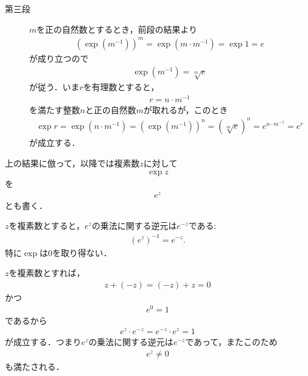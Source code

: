 \begin{sketch}
\begin{description}
			\item[第三段]
				$m$を正の自然数とするとき，前段の結果より
				\begin{align}
					(\exp{(m^{-1})})^{m} = \exp{(m \cdot m^{-1})} = \exp{1} = e
				\end{align}
				が成り立つので
				\begin{align}
					\exp{(m^{-1})} = \sqrt[m]{e}
				\end{align}
				が従う．いま$r$を有理数とすると，
				\begin{align}
					r = n \cdot m^{-1}
				\end{align}
				を満たす整数$n$と正の自然数$m$が取れるが，このとき
				\begin{align}
					\exp{r} = \exp{(n \cdot m^{-1})}
					= (\exp{(m^{-1})})^{n}
					= (\sqrt[m]{e})^{n}
					= e^{n \cdot m^{-1}}
					= e^r
				\end{align}
				が成立する．
				\QED
		\end{description}
	\end{sketch}
	
	上の結果に倣って，以降では複素数$z$に対して
	\begin{align}
		\exp{z}
	\end{align}
	を
	\begin{align}
		e^{z}
	\end{align}
	とも書く．
	
	\begin{screen}
		\begin{thm}[$e$のマイナス乗は逆元]\label{thm:inversion_of_exp_z_is_exp_minus_z}
			$z$を複素数とすると，$e^z$の乗法に関する逆元は$e^{-z}$である:
			\begin{align}
				(e^z)^{-1} = e^{-z}.
			\end{align}
			特に$\exp$は$0$を取り得ない．
		\end{thm}
	\end{screen}
	
	\begin{sketch}
		$z$を複素数とすれば，
		\begin{align}
			z + (-z) = (-z) + z = 0
		\end{align}
		かつ
		\begin{align}
			e^0 = 1
		\end{align}
		であるから
		\begin{align}
			e^z \cdot e^{-z} = e^{-z} \cdot e^z = 1
		\end{align}
		が成立する．つまり$e^{z}$の乗法に関する逆元は$e^{-z}$であって，またこのため
		\begin{align}
			e^{z} \neq 0
		\end{align}
		も満たされる．
		\QED
	\end{sketch}
	
